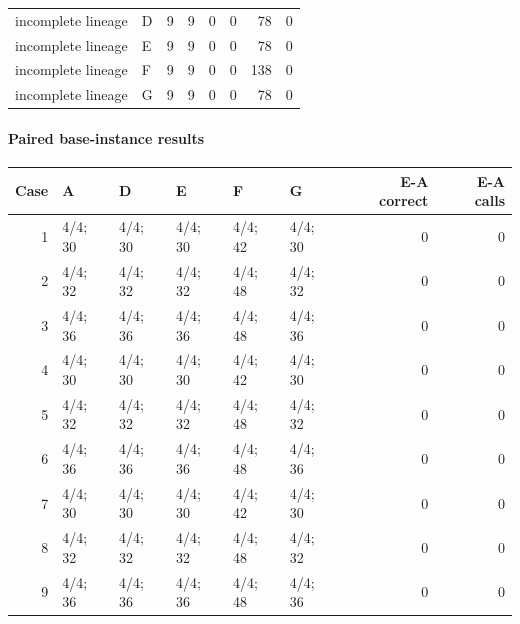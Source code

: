 \documentclass{article}
\begin{document}
\begin{minipage}{\linewidth}
\begin{center}
{\begin{tabular}{llrrrrrr}
incomplete lineage & D & 9 & 9 & 0 & 0 & 78 & 0 \\

incomplete lineage & E & 9 & 9 & 0 & 0 & 78 & 0 \\

incomplete lineage & F & 9 & 9 & 0 & 0 & 138 & 0 \\

incomplete lineage & G & 9 & 9 & 0 & 0 & 78 & 0 \\

\hline\end{tabular}}\end{center}\end{minipage}\par\medskip

\noindent\begin{minipage}{\linewidth}

\paragraph{Paired base-instance results}

\begin{center}{\footnotesize\setlength{\tabcolsep}{3pt}\begin{tabular}{rlllllrr}\hline

Case & A & D & E & F & G & E-A correct & E-A calls \\\hline

1 & 4/4; 30 & 4/4; 30 & 4/4; 30 & 4/4; 42 & 4/4; 30 & 0 & 0 \\

2 & 4/4; 32 & 4/4; 32 & 4/4; 32 & 4/4; 48 & 4/4; 32 & 0 & 0 \\

3 & 4/4; 36 & 4/4; 36 & 4/4; 36 & 4/4; 48 & 4/4; 36 & 0 & 0 \\

4 & 4/4; 30 & 4/4; 30 & 4/4; 30 & 4/4; 42 & 4/4; 30 & 0 & 0 \\

5 & 4/4; 32 & 4/4; 32 & 4/4; 32 & 4/4; 48 & 4/4; 32 & 0 & 0 \\

6 & 4/4; 36 & 4/4; 36 & 4/4; 36 & 4/4; 48 & 4/4; 36 & 0 & 0 \\

7 & 4/4; 30 & 4/4; 30 & 4/4; 30 & 4/4; 42 & 4/4; 30 & 0 & 0 \\

8 & 4/4; 32 & 4/4; 32 & 4/4; 32 & 4/4; 48 & 4/4; 32 & 0 & 0 \\

9 & 4/4; 36 & 4/4; 36 & 4/4; 36 & 4/4; 48 & 4/4; 36 & 0 & 0 \\

\hline\end{tabular}}\end{center}\end{minipage}\par\medskip
\end{document}
